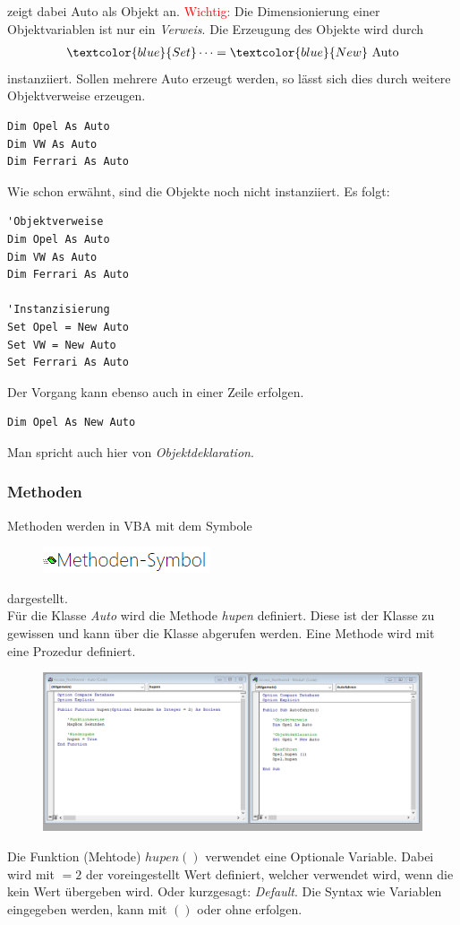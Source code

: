 zeigt dabei Auto als Objekt an. \textcolor{red}{Wichtig:} Die Dimensionierung einer Objektvariablen ist nur ein \textit{Verweis}. Die Erzeugung des Objekte wird durch 
\begin{align}
	\textcolor{blue}{Set }\dots = \textcolor{blue}{ New} \text{ Auto}
\end{align}
instanziiert. Sollen mehrere Auto erzeugt werden, so lässt sich dies durch weitere Objektverweise erzeugen.
\begin{lstlisting}[style=VBA]
Dim Opel As Auto
Dim VW As Auto
Dim Ferrari As Auto
\end{lstlisting}
Wie schon erwähnt, sind die Objekte noch nicht instanziiert. Es folgt:
\begin{lstlisting}[style=VBA]
'Objektverweise
Dim Opel As Auto
Dim VW As Auto
Dim Ferrari As Auto

'Instanzisierung
Set Opel = New Auto
Set VW = New Auto
Set Ferrari As Auto
\end{lstlisting}
Der Vorgang kann ebenso auch in einer Zeile erfolgen.

\begin{lstlisting}[style=VBA]
Dim Opel As New Auto
\end{lstlisting}
Man spricht auch hier von \textit{Objektdeklaration}. 
\subsubsection{Methoden}
Methoden werden in \gls{VBA} mit dem Symbole
\begin{figure}[H]
	\centering
	\includegraphics[scale = 1.3]{attachment/chapter_2/Scc030}
	\caption{}
	\label{fig:Scc030}
\end{figure} 
dargestellt. \\

Für die Klasse \textit{Auto} wird die Methode \textit{hupen} definiert. Diese ist der Klasse zu gewissen und kann über die Klasse abgerufen werden. Eine Methode wird mit eine Prozedur definiert. 
\begin{figure}[H]
	\centering
	\includegraphics[scale = 0.3]{attachment/chapter_2/Scc031}
	\caption{}
	\label{fig:Scc031}
\end{figure} 
Die Funktion (Mehtode) $hupen()$ verwendet eine Optionale Variable. Dabei wird mit $=2$ der voreingestellt Wert definiert, welcher verwendet wird, wenn die kein Wert übergeben wird. Oder kurzgesagt: \textit{Default}.
Die Syntax wie Variablen eingegeben werden, kann mit $()$ oder ohne erfolgen.
